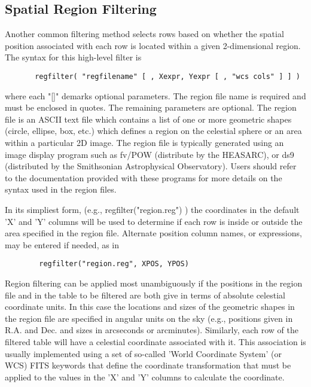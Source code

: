 \documentclass[11pt]{book}
\begin{document}
\subsection{Spatial Region Filtering}

    Another common  filtering method selects rows based on whether the
    spatial position associated with each row is located within a given
    2-dimensional region.  The syntax for this high-level filter is

\begin{verbatim}
       regfilter( "regfilename" [ , Xexpr, Yexpr [ , "wcs cols" ] ] )
\end{verbatim}
    where each "[]" demarks optional parameters. The region file name
    is required and must be  enclosed in quotes.  The remaining
    parameters are optional.  The region file is an ASCII text file
    which contains a list of one or more geometric shapes (circle,
    ellipse, box, etc.) which defines a region on the celestial sphere
    or an area within a particular 2D image.  The region file is
    typically generated using an image display program such as fv/POW
    (distribute by the HEASARC), or ds9 (distributed by the Smithsonian
    Astrophysical Observatory).  Users should refer to the documentation
    provided with these programs for more details on the syntax used in
    the region files.

    In its simpliest form, (e.g., regfilter("region.reg") ) the
    coordinates in the default 'X' and 'Y' columns will be used to
    determine if each row is inside or outside the area specified in
    the region file.  Alternate position column names, or expressions,
    may be entered if needed, as in

\begin{verbatim}
        regfilter("region.reg", XPOS, YPOS)
\end{verbatim}
    Region filtering can be applied most unambiguously if the positions
    in the region file and in the table to be filtered are both give in
    terms of absolute celestial coordinate units.  In this case the
    locations and sizes of the geometric shapes in the region file are
    specified in angular units on the sky (e.g., positions given in
    R.A. and Dec.  and sizes in arcseconds or arcminutes).  Similarly,
    each row of the filtered table will have a celestial coordinate
    associated with it.  This association is usually implemented using
    a set of so-called 'World Coordinate System' (or WCS) FITS keywords
    that define the coordinate transformation that must be applied to
    the values in the 'X' and 'Y' columns to calculate the coordinate.
\end{document}
